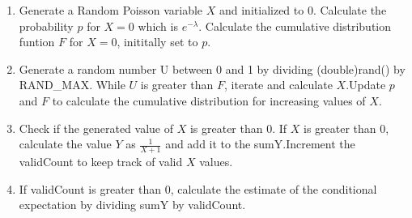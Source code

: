 \documentclass[journal,11pt,twocolumn]{IEEEtran}
\begin{document}
\begin{enumerate}[label=(\Alph*)]
\begin{enumerate}[label=(\roman*)]
	\item Generate a Random Poisson variable $X$ and initialized to 0. Calculate the probability $p$ for $X=0$ which is $e^{-\lambda}$. Calculate the cumulative distribution funtion $F$ for $X=0$, inititally set to $p$.
	\item Generate a random number U between 0 and 1 by dividing (double)rand() by RAND\_MAX.
	While $U$ is greater than $F$, iterate and calculate $X$.Update $p$ and $F$ to calculate the cumulative distribution for increasing values of $X$.
	\item Check if the generated value of $X$ is greater than 0. If $X$ is greater than 0, calculate the value $Y$ as $\frac{1}{X + 1}$ and add it to the sumY.Increment the validCount to keep track of valid $X$ values.
	\item If validCount is greater than 0, calculate the  estimate of the conditional expectation by dividing sumY by validCount.

\end{enumerate}
\end{enumerate}
\end{document}
